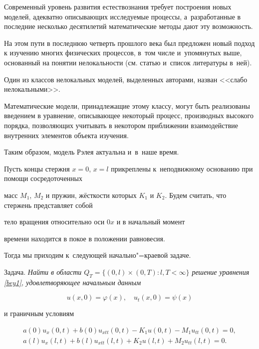 Современный уровень развития естествознания требует построения новых моделей, адекватно описывающих исследуемые процессы, а~разработанные в последние несколько десятилетий математические методы дают эту возможность. 

На этом пути в последнюю четверть прошлого века был предложен новый подход к изучению многих физических процессов, в~том числе и~упомянутых выше, основанный на понятии нелокальности (см. статью \cite{Baz} и~список литературы в~ней). 

Один из классов нелокальных моделей, выделенных авторами, назван <<слабо нелокальными>>. 

Математические модели, принадлежащие этому классу, могут быть реализованы введением в уравнение, описывающее некоторый процесс, производных высокого порядка, позволяющих учитывать в некотором приближении взаимодействие внутренних элементов объекта изучения. 

Таким образом, модель Рэлея актуальна и~в~наше время.



\smallskip




Пусть концы стержня $x=0$, $x=l$ прикреплены к~неподвижному основанию при помощи сосредоточенных

масс $M_1$, $M_2$ и пружин, жёсткости которых $K_1$ и $K_2$. Будем считать, что стержень представляет собой

тело вращения относительно оси $0x$ и в начальный момент

времени находится в покое в положении равновесия.

Тогда мы приходим к~следующей начально"=краевой задаче.



\smallskip

{\small\sc Задача.} \it  Найти в области  $Q_T=\{(0, l)\times (0, T) : l, T<\infty\}$ решение уравнения \rm  \eqref{bey1}, \it  удовлетворяющее  начальным данным

$$u(x, 0)=\varphi(x), \quad  u_t(x, 0)=\psi(x)$$

и граничным условиям

\begin{equation}

 \label{bey2}

\begin{array}{l}

 a(0)u_x(0,t)+b(0)u_{xtt}(0, t)-K_1u(0,t)-M_1u_{tt}(0,t)=0,

 \\[2mm]

a(l)u_x(l,t)+b(l)u_{xtt}(l, t)+K_2u(l,t)+M_2u_{tt}(l,t)=0.

\end{array}

\end{equation} \rm



